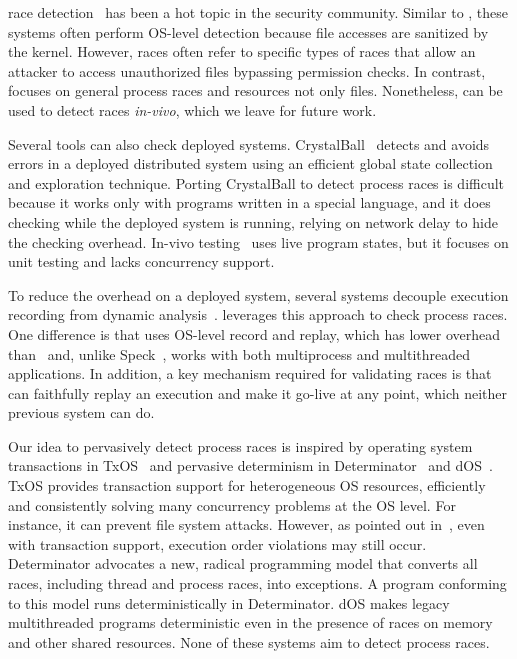   

 \toctou race
detection~\cite{toctou:fast08,toctou:usec03,toctou:fast05} has been a hot
topic in the security community.  Similar to \racepro, these systems often
perform OS-level detection because file accesses are sanitized by the
kernel.  However, \toctou races often refer to specific types of races that
allow an attacker to access unauthorized files bypassing permission
checks.  In contrast, \racepro focuses on general process races and resources
not only files.  Nonetheless, \racepro can be used to detect \toctou races
\emph{in-vivo}, which we leave for future work.

  Several tools can also check deployed
systems.  CrystalBall~\cite{crystalball:nsdi09} detects and avoids errors
in a deployed distributed system using an efficient global state
collection and exploration technique.  Porting CrystalBall to detect
process races is difficult because it works only with programs written in
a special language, and it does checking while the deployed system is
running, relying on network delay to hide the checking overhead.  In-vivo
testing~\cite{in-vivo-testing} uses live program states, but it focuses on
unit testing and lacks concurrency support.

To reduce the overhead on a deployed system, several systems decouple
execution recording from dynamic
analysis~\cite{decouple:usenix08,speck:asplos08}.  \racepro leverages this
approach to check process races.  One difference is that \racepro uses
OS-level record and replay, which has lower overhead
than~\cite{decouple:usenix08} and, unlike Speck~\cite{speck:asplos08},
\racepro works with both multiprocess and multithreaded applications. In addition, 
a key mechanism required for validating races is that \racepro can faithfully
replay an execution and make it go-live at any point, 
which neither previous system can do.

  Our idea to
pervasively detect process races is inspired by operating system
transactions in TxOS~\cite{txos:sosp09} and pervasive determinism in
Determinator~\cite{determinator:osdi10} and dOS~\cite{dos:osdi10}.  TxOS
provides transaction support for heterogeneous OS resources, efficiently
and consistently solving many concurrency problems at the OS level.  For
instance, it can prevent file system \toctou attacks.  However, as pointed
out in~\cite{lu:concurrency-bugs}, even with transaction support,
execution order violations may still occur.  Determinator advocates a
new, radical programming model that converts all races, including thread
and process races, into exceptions.  A program conforming to this model
runs deterministically in Determinator.  dOS makes legacy multithreaded
programs deterministic even in the presence of races on memory and other
shared resources.  None of these systems aim to detect process races.

